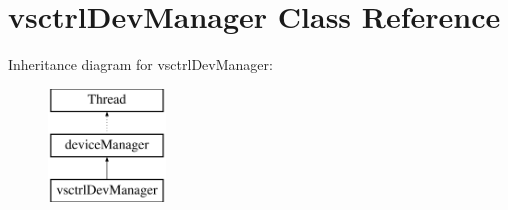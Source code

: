 \hypertarget{classvsctrlDevManager}{\section{vsctrl\-Dev\-Manager Class Reference}
\label{classvsctrlDevManager}
}
Inheritance diagram for vsctrl\-Dev\-Manager\-:\begin{figure}[H]
\begin{center}
\leavevmode
\includegraphics[height=3.000000cm]{classvsctrlDevManager}
\end{center}
\end{figure}
